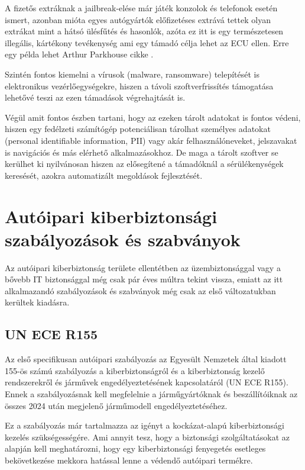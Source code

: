 A fizetős extráknak a jailbreak-elése már játék konzolok és telefonok esetén ismert, azonban mióta egyes autógyártók előfizetéses extrává tettek olyan extrákat mint a hátsó ülésfűtés és hasonlók, azóta ez itt is egy természetesen illegális, kártékony tevékenység ami egy támadó célja lehet az ECU ellen. Erre egy példa lehet Arthur Parkhouse cikke \cite{tesla}.

Szintén fontos kiemelni a vírusok (malware, ransomware) telepítését is elektronikus vezérlőegységekre, hiszen a távoli szoftverfrissítés támogatása lehetővé teszi az ezen támadások végrehajtását is.

Végül amit fontos észben tartani, hogy az ezeken tárolt adatokat is fontos védeni, hiszen egy fedélzeti számítógép potenciálisan tárolhat személyes adatokat (personal identifiable information, PII) vagy akár felhasználóneveket, jelszavakat is navigációs és más elérhető alkalmazásokhoz. De maga a tárolt szoftver se kerülhet ki nyilvánosan hiszen az elősegítené a támadóknál a sérülékenységek keresését, azokra automatizált megoldások fejlesztését.


\section{Autóipari kiberbiztonsági szabályozások és szabványok}

Az autóipari kiberbiztonság területe ellentétben az üzembiztonsággal vagy a bővebb IT biztonsággal még csak pár éves múltra tekint vissza, emiatt az itt alkalmazandó szabályozások és szabványok még csak az első változatukban kerültek kiadásra. 

\subsection{UN ECE R155}
Az első specifikusan autóipari szabályozás az Egyesült Nemzetek által kiadott 155-ös számú szabályozás a kiberbiztonságról és a kiberbiztonság kezelő rendszerekről és járművek engedélyeztetésének kapcsolatáról (UN ECE R155\cite{R155}). Ennek a szabályozásnak kell megfelelnie a járműgyártóknak és beszállítóiknak az összes 2024 után megjelenő járműmodell engedélyeztetéséhez.

Ez a szabályozás már tartalmazza az igényt a kockázat-alapú kiberbiztonsági kezelés szükségességére. Ami annyit tesz, hogy a biztonsági szolgáltatásokat az alapján kell meghatározni, hogy egy kiberbiztonsági fenyegetés esetleges bekövetkezése mekkora hatással lenne a védendő autóipari termékre.

